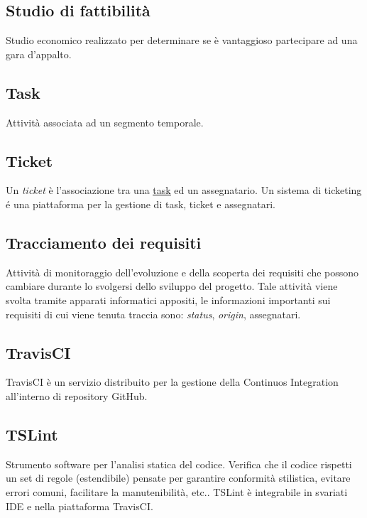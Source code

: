 	\subsection{Studio di fattibilità}
	\label{sec:studiofattibilita}
	Studio economico realizzato per determinare se è vantaggioso partecipare ad una gara d'appalto.


	\newpage


	\subsection{Task}
	\label{sec:task}
	Attività associata ad un segmento temporale.


	\subsection{Ticket}
	\label{sec:telegram}
	Un \emph{ticket} è l'associazione tra una \underline{\hyperref[sec:task]{task}} ed un assegnatario. Un sistema di ticketing é una piattaforma per la gestione di task, ticket e assegnatari.


	\subsection{Tracciamento dei requisiti}
	\label{sec:tracciamentorequisiti}
	Attività di monitoraggio dell'evoluzione e della scoperta dei requisiti che possono cambiare durante lo svolgersi dello sviluppo del progetto. Tale attività viene svolta tramite apparati informatici appositi, le informazioni importanti sui requisiti di cui viene tenuta traccia sono: \emph{status}, \emph{origin}, assegnatari.
	\subsection{TravisCI}
	\label{sec:travisci}
	TravisCI è un servizio distribuito per la gestione della Continuos Integration all'interno di repository GitHub.
	\subsection{TSLint}
	\label{sec:tslint}
	Strumento software per l'analisi statica del codice. Verifica che il codice rispetti un set di regole (estendibile) pensate per garantire conformità stilistica, evitare errori comuni, facilitare la manutenibilità, etc.. TSLint è integrabile in svariati IDE e nella piattaforma TravisCI.

